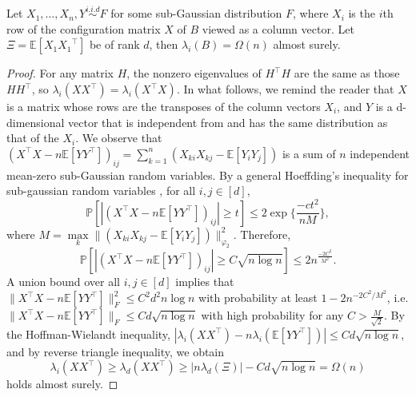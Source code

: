 \begin{lemma}
\label{appthm7}
  Let $X_1, \ldots, X_n, Y \stackrel{i.i.d}{\sim} F$ for some sub-Gaussian distribution $F$, where $X_i$ is the $i$th row of the configuration matrix $X$ of $B$ viewed as a column vector. Let $\Xi = \mathbb{E}[X_1 {X_1}^\top]$ be of rank $d$, then $\lambda_i(B) = \Omega(n)$ almost surely.
\end{lemma}
\begin{proof}
  For any matrix $H$, the nonzero eigenvalues of $H^\top H$ are the same as those $HH^\top $, so $\lambda_i(XX^\top) = \lambda_i(X^\top X)$. In what follows, we remind the reader that $X$ is a matrix whose rows are the transposes of the column vectors $X_i$, and $Y$ is a d-dimensional vector that is independent from and has the same distribution as that of the $X_i$.
  We observe that $(X^\top X - n \mathbb{E}[YY^\top] )_{ij} = \sum\limits_{k=1}^{n} (X_{ki}X_{kj} - \mathbb{E}[Y_iY_j])$ is a sum of $n$ independent mean-zero sub-Gaussian random variables.
By a general Hoeffding's inequality for sub-gaussian random variables \citep{HDP}, for all $i, j \in [d]$, 
$$\mathbb{P}[|(X^\top X - n\mathbb{E}[YY^\top])_{ij}|  \geq t]  \leq 2 \exp\{ \frac{-ct^2}{nM} \},$$  where $M = \max\limits_{k} 
\|(X_{ki}X_{kj} - \mathbb{E}[Y_iY_j] )\|_{\varphi_2}^2$. Therefore,
$$ \mathbb{P}[|(X^\top X - n\mathbb{E}[YY^\top])_{ij}| \geq C\sqrt{n\log n}]  \leq 2 n^{\frac{-2C^2}{M^2}}.$$
A union bound over all $i, j \in [d]$ implies that $\|X^\top X - n\mathbb{E}[YY^\top ]\|_{F}^2 \leq C^2 d^2 n \log n$ with probability at least 
$1 - 2 n^{-2C^2/M^2}$, i.e. $\|X^\top X - n\mathbb{E}[YY^\top ] \|_{F} \leq C d \sqrt{n \log n }$ with high probability for any $C > \frac{M}{\sqrt{2}}.$
By the Hoffman-Wielandt inequality, $|\lambda_i(XX^\top) - n \lambda_i(\mathbb{E}[YY^\top ])| \leq C d \sqrt{n \log n}$, and by reverse triangle inequality, we obtain $$\lambda_i(XX^\top ) \geq \lambda_d(XX^\top) \geq | n \lambda_d(\Xi) | - C d \sqrt{n \log n} = \Omega(n)$$ holds almost surely.
\end{proof}

